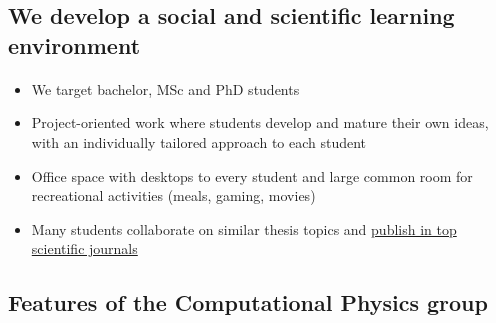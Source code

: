 \documentclass[%
twoside,                 %
final,                   %
10pt]{article}
\begin{document}
\noindent





\subsection{We develop a social and scientific learning environment}


\paragraph{}
\begin{itemize}
\item We target bachelor, MSc and PhD students

\item Project-oriented work where students develop and mature their own ideas, with an individually tailored approach to each student

\item Office space with desktops to every student and large common room for recreational activities (meals, gaming, movies)

\item Many students collaborate on similar  thesis topics and \href{{http://www.dn.no/talent/2014/06/12/Utdannelse/sommervikar-ble-toppforsker}}{publish in top scientific journals}
\end{itemize}

\noindent





\subsection{Features of the Computational Physics group}

\end{document}
